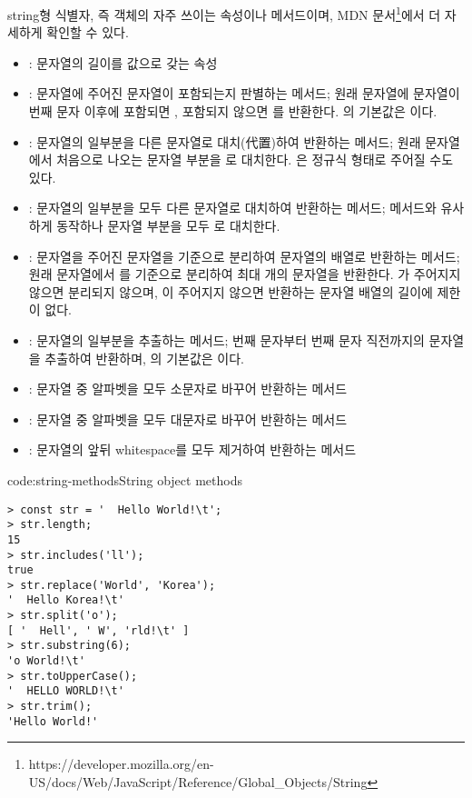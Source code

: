 string형 식별자, 즉  객체의 자주 쓰이는 속성이나 메서드이며, MDN 문서\footnote{https://developer.mozilla.org/en-US/docs/Web/JavaScript/Reference/Global\_Objects/String}에서 더 자세하게 확인할 수 있다.

\begin{itemize}
    \item {}: 문자열의 길이를 값으로 갖는 속성
    \item {}: 문자열에 주어진 문자열이 포함되는지 판별하는 메서드; 원래 문자열에  문자열이 번째 문자 이후에 포함되면 , 포함되지 않으면 를 반환한다. 의 기본값은 이다.
    \item {}: 문자열의 일부분을 다른 문자열로 대치(代置)하여 반환하는 메서드; 원래 문자열에서 처음으로 나오는  문자열 부분을 로 대치한다. 은 정규식 형태로 주어질 수도 있다.
    \item {}: 문자열의 일부분을 모두 다른 문자열로 대치하여 반환하는 메서드;  메서드와 유사하게 동작하나  문자열 부분을 모두 로 대치한다.
    \item {}: 문자열을 주어진 문자열을 기준으로 분리하여 문자열의 배열로 반환하는 메서드; 원래 문자열에서 를 기준으로 분리하여 최대 개의 문자열을 반환한다. 가 주어지지 않으면 분리되지 않으며, 이 주어지지 않으면 반환하는 문자열 배열의 길이에 제한이 없다.
    \item {}: 문자열의 일부분을 추출하는 메서드; 번째 문자부터 번째 문자 직전까지의 문자열을 추출하여 반환하며, 의 기본값은 이다.
    \item {}: 문자열 중 알파벳을 모두 소문자로 바꾸어 반환하는 메서드
    \item {}: 문자열 중 알파벳을 모두 대문자로 바꾸어 반환하는 메서드
    \item {}: 문자열의 앞뒤 whitespace를 모두 제거하여 반환하는 메서드
\end{itemize}

\begin{codeenv}{code:string-methods}{String object methods}\begin{verbatim}
> const str = '  Hello World!\t';
> str.length;
15
> str.includes('ll');
true
> str.replace('World', 'Korea');
'  Hello Korea!\t'
> str.split('o');
[ '  Hell', ' W', 'rld!\t' ]
> str.substring(6);
'o World!\t'
> str.toUpperCase();
'  HELLO WORLD!\t'
> str.trim();
'Hello World!'
\end{verbatim}
\end{codeenv}

